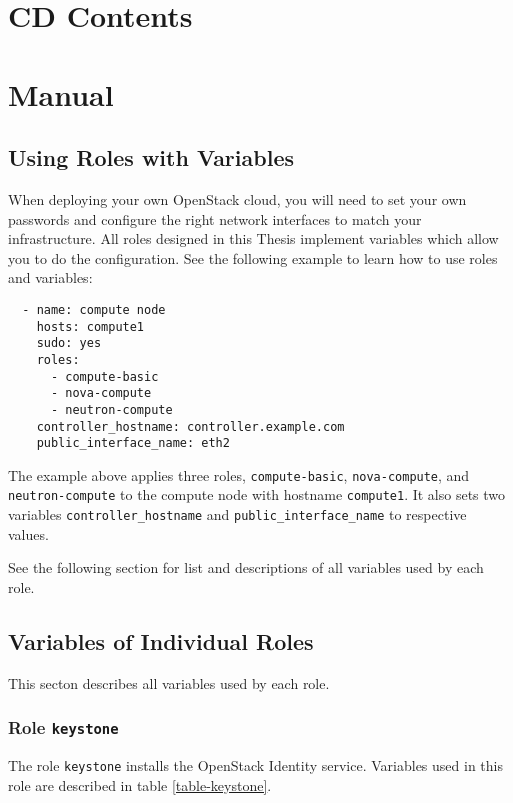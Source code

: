 \chapter{CD Contents}


\chapter{Manual}

\section{Using Roles with Variables}

When deploying your own OpenStack cloud, you will need to set your own passwords and configure the right network interfaces to match your infrastructure. All roles designed in this Thesis implement variables which allow you to do the configuration. See the following example to learn how to use roles and variables:

\begin{lstlisting}
  - name: compute node
    hosts: compute1
    sudo: yes
    roles:
      - compute-basic
      - nova-compute
      - neutron-compute
    controller_hostname: controller.example.com
    public_interface_name: eth2
\end{lstlisting}

The example above applies three roles, \texttt{compute-basic}, \texttt{nova-compute}, and \texttt{neutron-compute} to the compute node with hostname \texttt{compute1}. It also sets two variables \texttt{controller\_hostname} and \texttt{public\_interface\_name} to respective values.

See the following section for list and descriptions of all variables used by each role.

\section{Variables of Individual Roles}

This secton describes all variables used by each role.

\subsection{Role \texttt{keystone}}

The role \texttt{keystone} installs the OpenStack Identity service. Variables used in this role are described in table \ref{table-keystone}.

